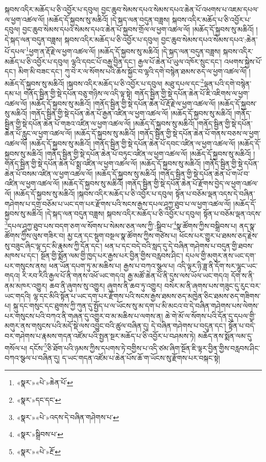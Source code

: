 སྐབས་འདིར་མཆོད་པ་ཅི་འབྱོར་པ་དབུལ། བྱང་ཆུབ་སེམས་དཔའ་སེམས་དཔའ་ཆེན་པོ་འཕགས་པ་འཇམ་དཔལ་ལ་ཕྱག་འཚལ་ལོ། །མཆོད་དོ་སྐྱབས་སུ་མཆིའོ། །དེ་སྐད་ལན་བདུན་བཟླས། སྐབས་འདིར་མཆོད་པ་ཅི་འབྱོར་པ་དབུལ། བྱང་ཆུབ་སེམས་དཔའ་སེམས་དཔའ་ཆེན་པོ་སྐྱབས་གྲོལ་ལ་ཕྱག་འཚལ་ལོ། །མཆོད་དོ་སྐྱབས་སུ་མཆིའོ། །དེ་སྐད་ལན་བདུན་བཟླས། སྐབས་འདིར་མཆོད་པ་ཅི་འབྱོར་པ་དབུལ། བྱང་ཆུབ་སེམས་དཔའ་སེམས་དཔའ་:ཆེན་པོ་དཔལ་\footnote{«སྣར་»«པེ་»ཆེན་པོ་}ཕྱག་ན་རྡོ་རྗེ་ལ་ཕྱག་འཚལ་ལོ། །མཆོད་དོ་སྐྱབས་སུ་མཆིའོ། །དེ་སྐད་ལན་བདུན་བཟླས། སྐབས་འདིར་མཆོད་པ་ཅི་འབྱོར་པ་དབུལ། ལྷའི་དབང་པོ་བརྒྱ་བྱིན་དང་། རྒྱལ་པོ་ཆེན་པོ་ཡུལ་འཁོར་སྲུང་དང་། འཕགས་སྐྱེས་པོ་དང་། མིག་མི་བཟང་དང་། ཀུ་བེ་ར་ལ་སོགས་པའི་ཆོས་སྐྱོང་བ་ལྷའི་དགེ་བསྙེན་ཐམས་ཅད་ལ་ཕྱག་འཚལ་ལོ། །
མཆོད་དོ་སྐྱབས་སུ་མཆིའོ། །སྐབས་འདིར་མཆོད་པ་ཅི་འབྱོར་པ་དབུལ། མཐུ་དཔལ་དང་\footnote{«སྣར་»དང་དང་}ལྡན་པའི་དགེ་བསྙེན་དམ་པ། གནོད་སྦྱིན་གྱི་སྡེ་དཔོན་བཅུ་གཉིས་ལ་འདི་ལྟ་སྟེ། གནོད་སྦྱིན་གྱི་སྡེ་དཔོན་ཆེན་པོ་ཇི་འཇིགས་ལ་ཕྱག་འཚལ་ལོ། །མཆོད་དོ་སྐྱབས་སུ་མཆིའོ། །གནོད་སྦྱིན་གྱི་སྡེ་དཔོན་ཆེན་པོ་རྡོ་རྗེ་ལ་ཕྱག་འཚལ་ལོ། །མཆོད་དོ་སྐྱབས་སུ་མཆིའོ། །གནོད་སྦྱིན་གྱི་སྡེ་དཔོན་ཆེན་པོ་རྒྱན་འཛིན་ལ་ཕྱག་འཚལ་ལོ། །མཆོད་དོ་སྐྱབས་སུ་མཆིའོ། །གནོད་སྦྱིན་གྱི་སྡེ་དཔོན་ཆེན་པོ་གཟའ་འཛིན་ལ་ཕྱག་འཚལ་ལོ། །མཆོད་དོ་སྐྱབས་སུ་མཆིའོ། །གནོད་སྦྱིན་གྱི་སྡེ་དཔོན་ཆེན་པོ་རླུང་ལ་ཕྱག་འཚལ་ལོ། །མཆོད་དོ་སྐྱབས་སུ་མཆིའོ། །གནོད་སྦྱིན་གྱི་སྡེ་དཔོན་ཆེན་པོ་གནས་བཅས་ལ་ཕྱག་འཚལ་ལོ། །མཆོད་དོ་སྐྱབས་སུ་མཆིའོ། །གནོད་སྦྱིན་གྱི་སྡེ་དཔོན་ཆེན་པོ་དབང་འཛིན་ལ་ཕྱག་འཚལ་ལོ། །མཆོད་དོ་སྐྱབས་སུ་མཆིའོ། །གནོད་སྦྱིན་གྱི་སྡེ་དཔོན་ཆེན་པོ་བཏུང་འཛིན་ལ་ཕྱག་འཚལ་ལོ། །མཆོད་དོ་སྐྱབས་སུ་མཆིའོ། །གནོད་སྦྱིན་གྱི་སྡེ་དཔོན་ཆེན་པོ་སྨྲ་འཛིན་ལ་ཕྱག་འཚལ་ལོ། །མཆོད་དོ་སྐྱབས་སུ་མཆིའོ། །གནོད་སྦྱིན་གྱི་སྡེ་དཔོན་ཆེན་པོ་བསམ་འཛིན་ལ་ཕྱག་འཚལ་ལོ། །མཆོད་དོ་སྐྱབས་སུ་མཆིའོ། །གནོད་སྦྱིན་གྱི་སྡེ་དཔོན་ཆེན་པོ་གཡོ་བ་འཛིན་ལ་ཕྱག་འཚལ་ལོ། །མཆོད་དོ་སྐྱབས་སུ་མཆིའོ། །གནོད་སྦྱིན་གྱི་སྡེ་དཔོན་ཆེན་པོ་རྫོགས་བྱེད་ལ་ཕྱག་འཚལ་ལོ། །མཆོད་དོ་སྐྱབས་སུ་མཆིའོ། །སྐབས་འདིར་མཆོད་པ་ཅི་འབྱོར་པ་དབུལ། སྟོན་པ་བཅོམ་ལྡན་འདས་དེ་བཞིན་གཤེགས་པ་དགྲ་བཅོམ་པ་ཡང་དག་པར་རྫོགས་པའི་སངས་རྒྱས་དཔལ་ཤཱཀྱ་ཐུབ་པ་ལ་ཕྱག་འཚལ་ལོ། །མཆོད་དོ་སྐྱབས་སུ་མཆིའོ། །དེ་སྐད་ལན་བདུན་བཟླས། སྐབས་འདིར་མཆོད་པ་ཅི་འབྱོར་པ་དབུལ། སྟོན་པ་བཅོམ་ལྡན་འདས་\footnote{«སྣར་»«པེ་»འདས་དེ་བཞིན་གཤེགས་པ་}དཔལ་ཤཱཀྱ་ཐུབ་པས་བདག་ཅག་ལ་སོགས་པ་སེམས་ཅན་ལས་ཀྱི་:སྒྲིབ་པ་\footnote{«སྣར་»སྒྲིབས་པ་}སྣ་ཚོགས་ཀྱིས་བསྒྲིབས་པ། ནད་སྣ་ཚོགས་ཀྱིས་ལུས་གཟིར་བ། མྱ་ངན་དང་སྡུག་བསྔལ་སྣ་ཚོགས་ཀྱིས་གཙེས་པ། ཕོངས་པར་གྱུར་པ་ཐམས་ཅད་རྗེས་སུ་བཟུང་ཞིང་ལྷ་དང་མི་རྣམས་ཀྱི་དོན་དང་། ཕན་པ་དང་བདེ་བའི་སླད་དུ་དེ་བཞིན་གཤེགས་པ་བདུན་གྱི་ཐབས་མཁས་པ་དང་། སྔོན་གྱི་སྨོན་ལམ་གྱི་ཁྱད་པར་རྒྱས་པར་བྱིན་གྱིས་བརླབས་ཤིང་། དཔལ་གྱི་མགུར་ནས་ཡང་དག་པར་གསུངས་ནས། ཕན་ཡོན་དཔག་ཏུ་མ་མཆིས་པ། རྒྱས་པ་བཀའ་སྩལ་པ། འདི་ལྟར་ཉི་ཟླ་ནི་དོག་སར་ལྷུང་ཡང་གདའ། རི་རབ་རིའི་རྒྱལ་པོ་ནི་གནས་འཕོ་ཡང་གདའ། རྒྱ་མཚོ་ཆེན་པོ་ནི་དུས་ལས་ཡོལ་ཡང་གདའ། དོག་ས་ནི་ནམ་མཁར་འགྱུར། ཆབ་ནི་ཞུགས་སུ་འགྱུར། ཞུགས་ནི་ཆབ་ཏུ་འགྱུར། བསེར་མ་ནི་ཞགས་པས་གཟུང་དུ་རུང་བར་ཡང་གདའི། ལྷ་དང་མིའི་སྟོན་པ་ཡང་དག་པར་རྫོགས་པའི་སངས་རྒྱས་ཐམས་ཅད་མཁྱེན་ཅིང་ཐམས་ཅད་གཟིགས་པ། སྐུ་དང་གསུང་དང་ཐུགས་ཀྱི་ཀུན་དུ་སྤྱོད་པ་ལ་ཡོངས་སུ་མ་དག་པ་མི་མངའ་བ་དེ་བཞིན་གཤེགས་པས་ལེགས་པར་གསུངས་པའི་བཀའ་ནི་གཞན་དུ་འགྱུར་བ་མ་མཆིས་པ་ལགས་ན། ཆེ་གེ་མོ་ལ་སོགས་པའི་དོན་དུ་དཔལ་གྱི་མགུར་ནས་གསུངས་པའི་མདོ་སྡེ་ལས་འབྱུང་བའི་ཚུལ་བཞིན་དུ། དེ་བཞིན་གཤེགས་པ་བདུན་དང་། སྟོན་པ་བདེ་བར་གཤེགས་པ་རྣམས་གདན་འཛོམ་པའི་སྤྱན་སྔར་མཆོད་པ་ཅི་འབྱོར་པ་བཤམས་ཏེ། མཆོད་ནས་སྨོན་ལམ་དུ་གསོལ་པ། དངོས་\footnote{«སྣར་»«པེ་»རྔོ་}ཅི་ཐོག་པའི་ཉམས་ཀྱིས་དཔགས་ཏེ་བགྱིས་པ་འདི་ཙམ་ཞིག་སྔོན་ཇི་ལྟར་བྱིན་གྱིས་བརླབས་ཤིང་བཀའ་སྩལ་པ་བཞིན་དུ། ད་ཡང་གདན་འཛོམ་པ་ཆེན་པོས་ཆོ་ག་ཡོངས་སུ་རྫོགས་པར་བསྐང་སྟེ། 
